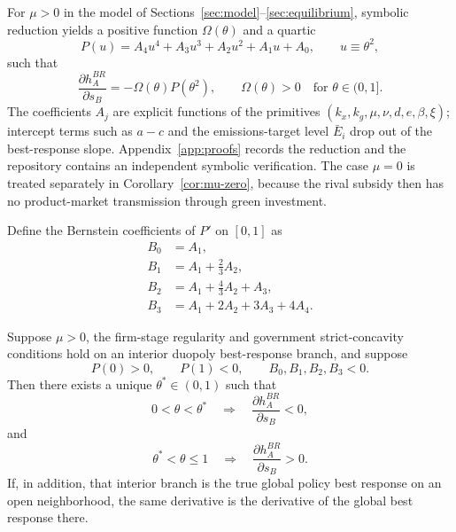 For $\mu>0$ in the model of Sections~\ref{sec:model}--\ref{sec:equilibrium}, symbolic reduction yields a positive function $\Omega(\theta)$ and a quartic
\begin{equation}
P(u)=A_4u^4+A_3u^3+A_2u^2+A_1u+A_0,
\qquad u\equiv\theta^2,
\label{eq:P-def}
\end{equation}
such that
\begin{equation}
\frac{\partial h_A^{BR}}{\partial s_B}
=-\Omega(\theta)P(\theta^2),
\qquad \Omega(\theta)>0
\quad\text{for }\theta\in(0,1].
\label{eq:P-sign}
\end{equation}
The coefficients $A_j$ are explicit functions of the primitives $(k_x,k_g,\mu,\nu,d,e,\beta,\xi)$; intercept terms such as $a-c$ and the emissions-target level $\bar E_i$ drop out of the best-response slope. Appendix~\ref{app:proofs} records the reduction and the repository contains an independent symbolic verification. The case $\mu=0$ is treated separately in Corollary~\ref{cor:mu-zero}, because the rival subsidy then has no product-market transmission through green investment.

Define the Bernstein coefficients of $P'$ on $[0,1]$ as
\begin{align}
B_0&=A_1,\\
B_1&=A_1+\frac23A_2,\\
B_2&=A_1+\frac43A_2+A_3,\\
B_3&=A_1+2A_2+3A_3+4A_4.
\label{eq:bernstein-derivative}
\end{align}

\begin{proposition}
\label{prop:threshold}
Suppose $\mu>0$, the firm-stage regularity and government strict-concavity conditions hold on an interior duopoly best-response branch, and suppose
\begin{equation}
P(0)>0,\qquad P(1)<0,
\qquad B_0,B_1,B_2,B_3<0.
\label{eq:threshold-conditions}
\end{equation}
Then there exists a unique $\theta^*\in(0,1)$ such that
\begin{equation}
0<\theta<\theta^*
\quad\Longrightarrow\quad
\frac{\partial h_A^{BR}}{\partial s_B}<0,
\end{equation}
and
\begin{equation}
\theta^*<\theta\leq1
\quad\Longrightarrow\quad
\frac{\partial h_A^{BR}}{\partial s_B}>0.
\end{equation}
If, in addition, that interior branch is the true global policy best response on an open neighborhood, the same derivative is the derivative of the global best response there.
\end{proposition}

